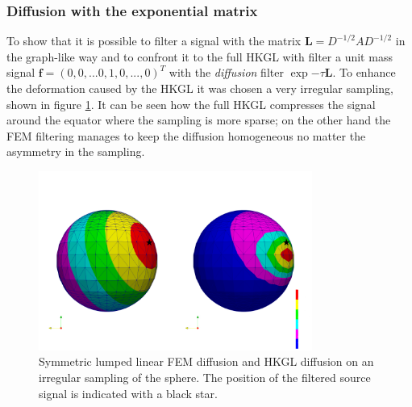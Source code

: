 \subsubsection{Diffusion with the exponential matrix}

To show that it is possible to filter a signal with the matrix $\mathbf L = D^{-1/2}AD^{-1/2}$ in the graph-like way and to confront it to the full HKGL with filter a unit mass signal $\mathbf{f}=(0,0,...0,1,0,...,0)^T$ with the \textit{diffusion} filter $\exp{-\tau \mathbf L}$. To enhance the deformation caused by the HKGL it was chosen a very irregular sampling, shown in figure \ref{fig:FEM lumped symmetric diffusion on irregular sampling}. It can be seen how the full HKGL compresses the signal around the equator where the sampling is more sparse; on the other hand the FEM filtering manages to keep the diffusion homogeneous no matter the asymmetry in the sampling. 
\begin{figure}[h]
	\centering
	\includegraphics[width=0.8\textwidth]{figs/Chapter3/diffusion.png}
	\caption{\label{fig:FEM lumped symmetric diffusion on irregular sampling}Symmetric lumped linear FEM diffusion and HKGL diffusion on an irregular sampling of the sphere. The position of the filtered source signal is indicated with a black star.}
\end{figure}






